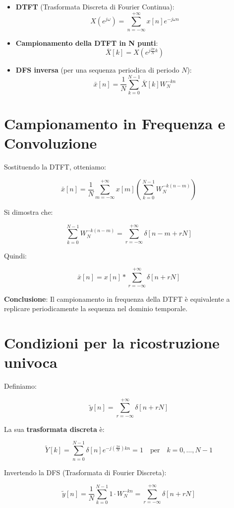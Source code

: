 \begin{itemize}
    \item \textbf{DTFT} (Trasformata Discreta di Fourier Continua):
    \[
    X(e^{j\omega}) = \sum_{n=-\infty}^{+\infty} x[n] e^{-j\omega n}
    \]
    
    \item \textbf{Campionamento della DTFT in N punti}:
    \[
    \bar{X}[k] = X(e^{j \frac{2\pi}{N} k})
    \]

    \item \textbf{DFS inversa} (per una sequenza periodica di periodo \( N \)):
    \[
    \bar{x}[n] = \frac{1}{N} \sum_{k=0}^{N-1} \bar{X}[k] W_N^{-kn}
    \]
\end{itemize}

\section*{Campionamento in Frequenza e Convoluzione}

Sostituendo la DTFT, otteniamo:

\[
\bar{x}[n] = \frac{1}{N} \sum_{m=-\infty}^{+\infty} x[m] \left( \sum_{k=0}^{N-1} W_N^{-k(n-m)} \right)
\]

Si dimostra che:

\[
\sum_{k=0}^{N-1} W_N^{-k(n-m)} = \sum_{r=-\infty}^{+\infty} \delta[n - m + rN]
\]

Quindi:

\[
\bar{x}[n] = x[n] * \sum_{r=-\infty}^{+\infty} \delta[n + rN]
\]

\textbf{Conclusione}: Il campionamento in frequenza della DTFT è equivalente a replicare periodicamente la sequenza nel dominio temporale.

\section{Condizioni per la ricostruzione univoca}

Definiamo:

\[
\tilde{y}[n] = \sum_{r=-\infty}^{+\infty} \delta[n + rN]
\]

La sua \textbf{trasformata discreta} è:

\[
\tilde{Y}[k] = \sum_{n=0}^{N-1} \delta[n] e^{-j \left( \frac{2\pi}{N} \right) k n} = 1 \quad \text{per} \quad k = 0, \dots, N-1
\]

Invertendo la DFS (Trasformata di Fourier Discreta):

\[
\tilde{y}[n] = \frac{1}{N} \sum_{k=0}^{N-1} 1 \cdot W_N^{-kn} = \sum_{r=-\infty}^{+\infty} \delta[n + rN]
\]

